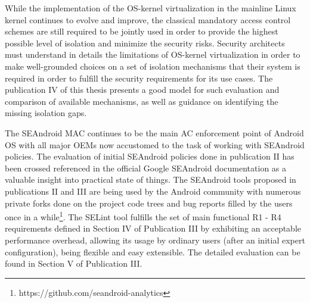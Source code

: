 While the implementation of the OS-kernel virtualization in the mainline Linux kernel continues to evolve and improve, the classical mandatory access control schemes are still required to be jointly used in order to provide the highest possible level of isolation and minimize the security risks. Security architects must understand in details the limitations of OS-kernel virtualization in order to make well-grounded choices on a set of isolation mechanisms that their system is required in order to fulfill the security requirements for its use cases. The publication IV of this thesis presents a good model for such evaluation and comparison of available mechanisms, as well as guidance on identifying the missing isolation gaps. 

The SEAndroid MAC continues to be the main AC enforcement point of Android OS with all major OEMs now accustomed to the task of working with SEAndroid policies. The evaluation of initial SEAndroid policies done in publication II has been crossed referenced in the official Google SEAndroid documentation as a valuable insight into practical state of things. The SEAndroid tools proposed in publications II and III are being used by the Android community with numerous private forks done on the project code trees and bug reports filled by the users once in a while\footnote{https://github.com/seandroid-analytics}. The SELint tool fulfills the set of main functional R1 - R4 requirements defined in Section IV of Publication III by exhibiting an acceptable performance overhead, allowing its usage by ordinary users (after an initial expert configuration), being flexible and easy extensible. The detailed evaluation can be found in Section V of Publication III. 



